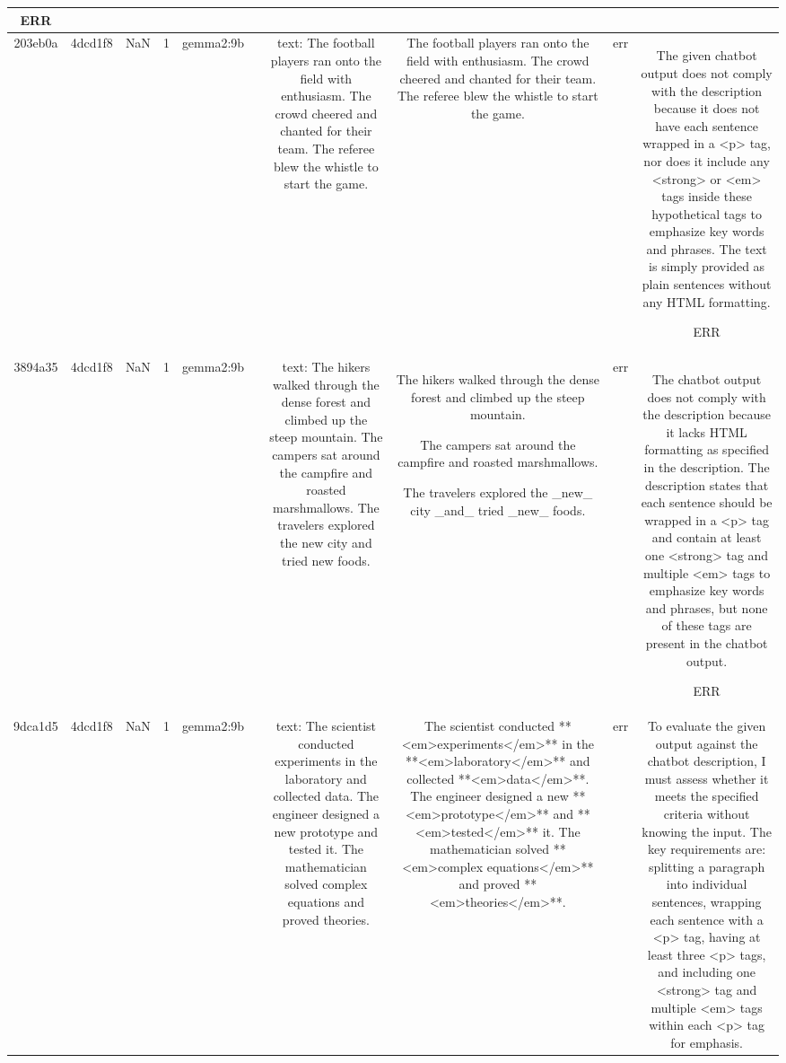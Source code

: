 \begin{table}[h!]
\begin{tabular}{|c|c|c|c|c|c|c|c|c|c|}
ERR\\
\hline
203eb0a & 4dcd1f8 & NaN & 1 & gemma2:9b &  & text: The football players ran onto the field with enthusiasm. The crowd cheered and chanted for their team. The referee blew the whistle to start the game. & The football players ran onto the field with enthusiasm. 
The crowd cheered and chanted for their team.
The referee blew the whistle to start the game. 


 & err & The given chatbot output does not comply with the description because it does not have each sentence wrapped in a <p> tag, nor does it include any <strong> or <em> tags inside these hypothetical tags to emphasize key words and phrases. The text is simply provided as plain sentences without any HTML formatting.

ERR\\
\hline
3894a35 & 4dcd1f8 & NaN & 1 & gemma2:9b &  & text: The hikers walked through the dense forest and climbed up the steep mountain. The campers sat around the campfire and roasted marshmallows. The travelers explored the new city and tried new foods. & The hikers walked through the dense forest and climbed up the steep mountain. 

The campers sat around the campfire and roasted marshmallows. 

The travelers explored the _new_ city _and_ tried _new_ foods.   



 & err & The chatbot output does not comply with the description because it lacks HTML formatting as specified in the description. The description states that each sentence should be wrapped in a <p> tag and contain at least one <strong> tag and multiple <em> tags to emphasize key words and phrases, but none of these tags are present in the chatbot output.

ERR\\
\hline
9dca1d5 & 4dcd1f8 & NaN & 1 & gemma2:9b &  & text: The scientist conducted experiments in the laboratory and collected data. The engineer designed a new prototype and tested it. The mathematician solved complex equations and proved theories. & The scientist conducted **<em>experiments</em>** in the **<em>laboratory</em>** and collected **<em>data</em>**. 
The engineer designed a new **<em>prototype</em>** and **<em>tested</em>** it. 
The mathematician solved **<em>complex equations</em>** and proved **<em>theories</em>**.  


 & err & To evaluate the given output against the chatbot description, I must assess whether it meets the specified criteria without knowing the input. The key requirements are: splitting a paragraph into individual sentences, wrapping each sentence with a <p> tag, having at least three <p> tags, and including one <strong> tag and multiple <em> tags within each <p> tag for emphasis.


\end{tabular}
\end{table}
